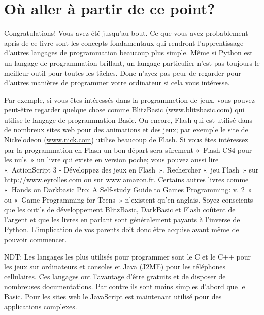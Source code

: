 


\chapter{Où aller à partir de ce point?}

Congratulations! Vous avez été jusqu'au bout. Ce que vous avez probablement apris de ce livre sont les concepts fondamentaux qui rendront l'apprentissage d'autres langages de programmation beaucoup plus simple. Même si Python est un langage de programmation brillant, un langage particulier n'est pas toujours le meilleur outil pour toutes les tâches. Donc n'ayez pas peur de regarder pour d'autres manières de programmer votre ordinateur si cela vous intéresse.

Par exemple, si vous êtes intéressés dans la programmetion de jeux, vous pouvez peut-être regarder quelque chose comme BlitzBasic (\url{www.blitzbasic.com}) qui utilise le langage de programmation Basic. Ou encore, Flash qui est utilisé dans de nombreux sites web pour des animations et des jeux; par exemple le site de Nickelodeon (\url{www.nick.com}) utilise  beaucoup de Flash. Si vous êtes intéressez par la programmation en Flash un bon départ sera sûrement «~Flash CS4 pour les nuls~» un livre qui existe en version poche; vous pouvez aussi lire «~ActionScript 3 - Développez des jeux en Flash~». Rechercher «~jeu Flash~» sur \url{http://www.eyrolles.com} ou sur \url{www.amazon.fr}. Certains autres livres comme «~Hands on Darkbasic Pro: A Self-study Guide to Games Programming: v. 2~» ou «~Game Programming for Teens~» n'existent qu'en anglais.
Soyez conscients que les outils de développement BlitzBasic, DarkBasic et Flash coûtent de l'argent et que les livres en parlant sont généralement payants à l'inverse de Python. L'implication de vos parents doit donc être acquise avant même de pouvoir commencer.

NDT: Les langages les plus utilisés pour programmer sont le C et le C++ pour les jeux sur ordinateurs et consoles et Java (J2ME) pour les téléphones cellulaires. Ces langages ont l'avantage d'être gratuits et de disposer de nombreuses documentations. Par contre ils sont moins simples d'abord que le Basic. Pour les sites web le JavaScript est maintenant utilisé pour des applications complexes.

